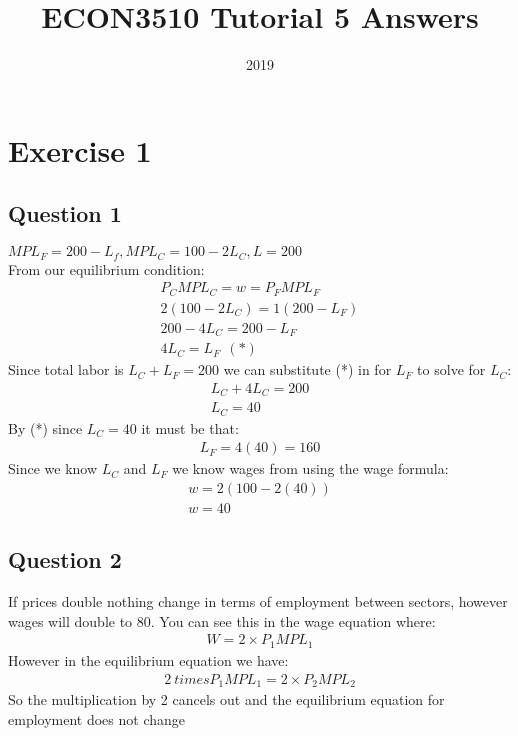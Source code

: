 \documentclass{article}
\title{ECON3510 Tutorial 5 Answers}
\date{2019}
\begin{document}
\maketitle

\section{Exercise 1}
\vspace{6mm}
\subsection{Question 1}


$MPL_{F} = 200 - L_{f}, MPL_{C} = 100 - 2L_{C}, L = 200$ \\
From our equilibrium condition:
\begin{gather*}
  P_{C} MPL_{C} = w = P_{F}MPL_{F} \\
  2(100 - 2L_{C}) = 1(200 - L_{F}) \\
  200 - 4L_{C} = 200 - L_{F} \\
  4 L_{C} = L_{F} \ \ (*)
\end{gather*}
Since total labor is $L_{C} + L_{F} = 200$ we can substitute (*) in for $L_{F}$ to solve for $L_{C}$:
\begin{gather*}
  L_{C} + 4 L_{C} = 200 \\
  L_{C} = 40
\end{gather*}
By (*) since $L_{C} = 40$ it must be that:
\begin{gather*}
L_{F} = 4(40) = 160
\end{gather*}
Since we know $L_{C}$ and $L_{F}$ we know wages from using the wage formula:
\begin{gather*}
  w = 2(100 - 2(40)) \\
  w = 40
\end{gather*}


\par \vspace{0.8em}
\subsection{Question 2}

If prices double nothing change in terms of employment between sectors, however wages will double to 80. You can see this in the wage equation where:
\begin{gather*}
  W = 2 \times P_{1}MPL_{1}
\end{gather*}
However in the equilibrium equation we have:
\begin{gather*}
  2 \ times P_{1} MPL_{1} = 2 \times P_{2} MPL_{2}
\end{gather*}
So the multiplication by 2 cancels out and the equilibrium equation for employment does not change
\end{document}
